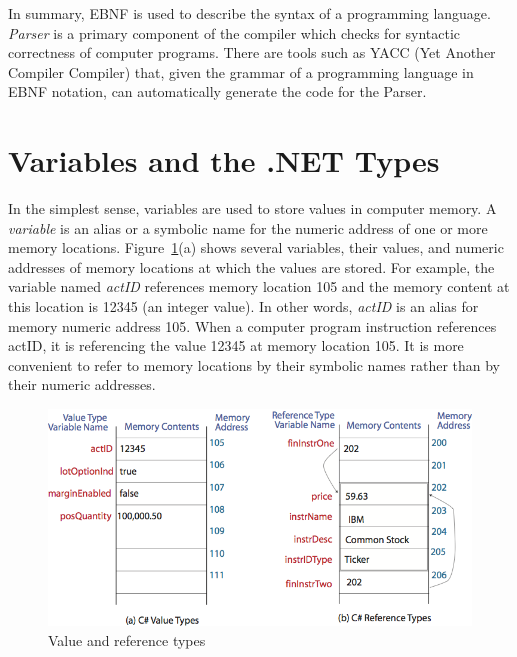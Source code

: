 In summary, EBNF is used to describe the syntax of a programming
language. \emph{Parser} is a primary component of the compiler
which checks for syntactic correctness of computer programs. There
are tools such as YACC (Yet Another Compiler Compiler) that, given
the grammar of a programming language in EBNF notation, can
automatically generate the code for the Parser.


{\samepage\vspace{1ex}\noindent\usebox{\phicsep}\vspace{1.5ex}}
\vspace{-0.4in}
\section{Variables and the .NET Types} \label{sec:DataTypes}


In the simplest sense, variables are used to store values in
computer memory. A \emph{variable} is an alias or a symbolic name
for the numeric address of one or more memory locations.
Figure~\ref{fig:ValRefTypes}(a) shows several variables, their
values, and numeric addresses of memory locations at which the
values are stored. For example, the variable named \emph{actID}
references memory location 105 and the memory content at this
location is 12345 (an integer value). In other words, \emph{actID}
is an alias for memory numeric address 105. When a computer
program instruction references actID, it is referencing the value
12345 at memory location 105. It is more convenient to refer to
memory locations by their symbolic names rather than by their
numeric addresses.


\begin{figure}
\centering
\includegraphics[scale=0.75]{./CSharpBasics/Illus/ValueRefTypes}
\caption{Value and reference types} \label{fig:ValRefTypes}
\end{figure}


